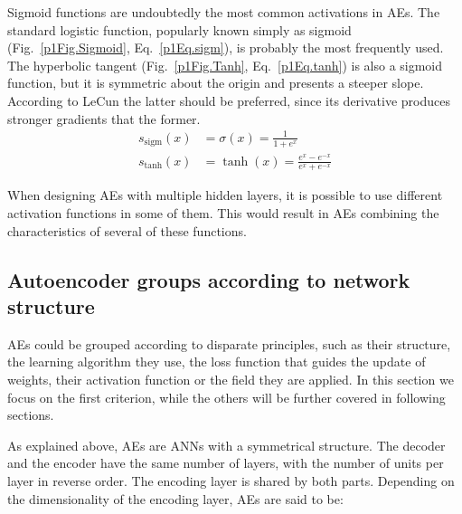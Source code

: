 Sigmoid functions are  undoubtedly the most common activations in AEs. The standard logistic function, popularly known simply as  sigmoid (Fig.~\ref{p1Fig.Sigmoid}, Eq.~\ref{p1Eq.sigm}), is probably the most frequently used. The hyperbolic tangent (Fig.~\ref{p1Fig.Tanh}, Eq.~\ref{p1Eq.tanh}) is also a sigmoid function, but it is symmetric about the origin and presents a steeper slope. According to LeCun  the latter should be preferred, since its derivative produces stronger gradients that the former.
\begin{align}
  \label{p1Eq.sigm} s_{\mathrm{sigm}}(x) &= \sigma(x) = \frac{1}{1+e^x} \\
  \label{p1Eq.tanh} s_{\mathrm{tanh}}(x) &= \tanh(x) = \frac{e^x-e^{-x}}{e^x+e^{-x}}
\end{align}


When designing AEs with multiple hidden layers, it is possible to use different activation functions in some of them. This would result in AEs combining the characteristics of several of these functions.


\subsection{Autoencoder groups according to network structure}

AEs could be grouped according to disparate principles, such as their structure, the learning algorithm they use, the loss function that guides the update of weights, their activation function or the field they are applied. In this section we focus on the first criterion, while the others will be further covered in following sections. 

As explained above, AEs are ANNs with a symmetrical structure. The decoder and the encoder have the same number of layers, with the number of units per layer in reverse order. The encoding layer is shared by both parts. Depending on the dimensionality of the encoding layer, AEs are said to be:

